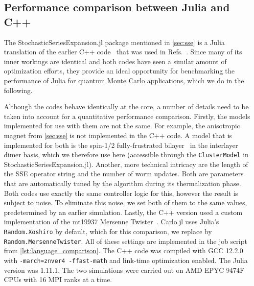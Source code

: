 \documentclass{SciPost}
\begin{document}
\subsection{Performance comparison between Julia and C++}
The StochasticSeriesExpansion.jl package mentioned in \cref{sec:sse} is a Julia translation of the earlier C++ code~\cite{WeberFrust2024} that was used in Refs.~\cite{Jimenez2021,Weber2022,WeberCluster2022,WeberThermal2022,weber_cavityrenormalized_2023}. Since many of its inner workings are identical and both codes have seen a similar amount of optimization efforts, they provide an ideal opportunity for benchmarking the performance of Julia for quantum Monte Carlo applications, which we do in the following.

Although the codes behave identically at the core, a number of details need to be taken into account for a quantitative performance comparison. Firstly, the models implemented for use with them are not the same. For example, the anisotropic magnet from \cref{sec:sse} is not implemented in the C++ code. A model that is implemented for both is the spin-1/2 fully-frustrated bilayer~\cite{MullerHartmannExact2000,Alet2016} in the interlayer dimer basis, which we therefore use here (accessible through the \texttt{ClusterModel} in StochasticSeriesExpansion.jl). Another, more technical intricacy are the length of the SSE operator string and the number of worm updates. Both are parameters that are automatically tuned by the algorithm during its thermalization phase. Both codes use exactly the same controller logic for this, however the result is subject to noise. To eliminate this noise, we set both of them to the same values, predetermined by an earlier simulation. Lastly, the C++ version used a custom implementation of the mt19937 Mersenne Twister~\cite{Matsumoto1998}. Carlo.jl uses Julia’s \texttt{Random.Xoshiro} by default, which for this comparison, we replace by \texttt{Random.MersenneTwister}. All of these settings are implemented in the job script from \cref{lst:language_comparison}. The C++ code was compiled with GCC 12.2.0 with \texttt{-march=znver4 -ffast-math} and link-time optimization enabled. The Julia version was 1.11.1. The two simulations were carried out on AMD EPYC 9474F CPUs with 16 MPI ranks at a time.
\end{document}
